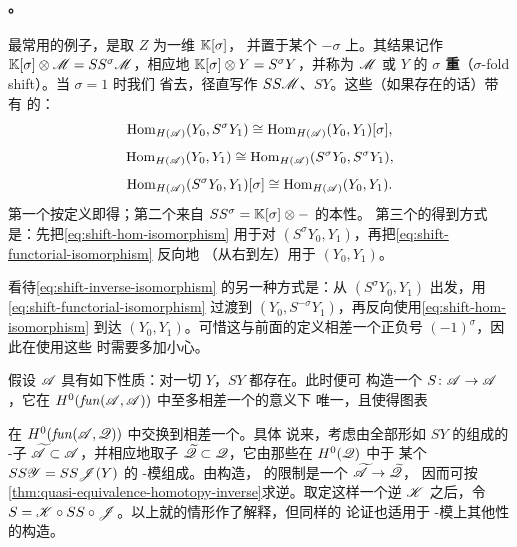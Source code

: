 \paragraph{\trSuspension。}\label{sub:shift}
\trTensorProduct{}最常用的例子，是取 $Z$ 为一维\trVectorSpace{} $\mathbb{K}[\sigma]$，
并置于某个\trDegree{} $-\sigma$ 上。其结果记作
$\mathbb{K}[\sigma]\otimes\mathscr{M}=SS^{\sigma}\mathscr{M}$，相应地
$\mathbb{K}[\sigma]\otimes Y=S^{\sigma}Y$，并称为 $\mathscr{M}$ 或 $Y$ 的%
\textbf{$\sigma$ 重\trSuspension}（$\sigma$-fold shift）。当 $\sigma=1$ 时我们
省去\trIndex，径直写作 $SS\mathscr{M}$、$SY$。这些\trSuspension（如果存在的话）带有%
\trCanonical{}的\trIsomorphism：
\begin{equation}\label{eq:shift-hom-isomorphism}
\operatorname{Hom}_{H(\mathscr{A})}(Y_0,S^{\sigma}Y_1)\cong\operatorname{Hom}_{H(\mathscr{A})}(Y_0,Y_1)[\sigma],
\end{equation}
\begin{equation}\label{eq:shift-functorial-isomorphism}
\operatorname{Hom}_{H(\mathscr{A})}(Y_0,Y_1)\cong\operatorname{Hom}_{H(\mathscr{A})}(S^{\sigma}Y_0,S^{\sigma}Y_1),
\end{equation}
\begin{equation}\label{eq:shift-inverse-isomorphism}
\operatorname{Hom}_{H(\mathscr{A})}(S^{\sigma}Y_0,Y_1)[\sigma]\cong\operatorname{Hom}_{H(\mathscr{A})}(Y_0,Y_1).
\end{equation}
第一个按定义即得；第二个来自 $SS^{\sigma}=\mathbb{K}[\sigma]\otimes-$ 的\trFunctor{}本性。
第三个的得到方式是：先把\eqref{eq:shift-hom-isomorphism} 用于对
$(S^{\sigma}Y_0,Y_1)$，再把\eqref{eq:shift-functorial-isomorphism} 反向地
（从右到左）用于 $(Y_0,Y_1)$。

\begin{remark}\label{thm:shift-sign-caution}
看待\eqref{eq:shift-inverse-isomorphism} 的另一种方式是：从
$(S^{\sigma}Y_0,Y_1)$ 出发，用\eqref{eq:shift-functorial-isomorphism} 过渡到
$(Y_0,S^{-\sigma}Y_1)$，再反向使用\eqref{eq:shift-hom-isomorphism} 到达
$(Y_0,Y_1)$。可惜这与前面的定义相差一个正负号 $(-1)^{\sigma}$，因此在使用这些%
\trIsomorphism{}时需要多加小心。
\end{remark}

假设 \trACategory{} $\mathscr{A}$ 具有如下性质：对一切 $Y$，$SY$ 都存在。此时便可
构造一个\trSuspension{} \trAFunctor{} $S\colon\mathscr{A}\to\mathscr{A}$，它在
$H^0(\mathit{fun}(\mathscr{A},\mathscr{A}))$ 中至多相差一个\trIsomorphism{}的意义下
唯一，且使得图表
在 $H^0(\mathit{fun}(\mathscr{A},\mathscr{Q}))$ 中交换到相差一个\trIsomorphism。具体
说来，考虑由全部形如 $SY$ 的\trObject{}组成的\trFull{} \trAinfty-子\trCategory{}%
$\widetilde{\mathscr{A}}\subset\mathscr{A}$，并相应地取子\trCategory{}%
$\widetilde{\mathscr{Q}}\subset\mathscr{Q}$，它由那些在 $H^0(\mathscr{Q})$ 中\trIsomorphic{}于
某个 $SS\mathscr{Y}=SS\mathscr{J}(Y)$ 的 \trAinfty-模组成。由构造，\trYonedaEmbedding{}%
的限制是一个\trQuasiequivalence{} $\widetilde{\mathscr{A}}\to\widetilde{\mathscr{Q}}$，
因而可按\cref{thm:quasi-equivalence-homotopy-inverse}求逆。取定这样一个逆 $\mathscr{K}$ 之后，令
$S=\mathscr{K}\circ SS\circ\mathscr{J}$。以上就\trSuspension{}的情形作了解释，但同样的
论证也适用于 \trAinfty-模上其他\trFunctor{}性的构造。

